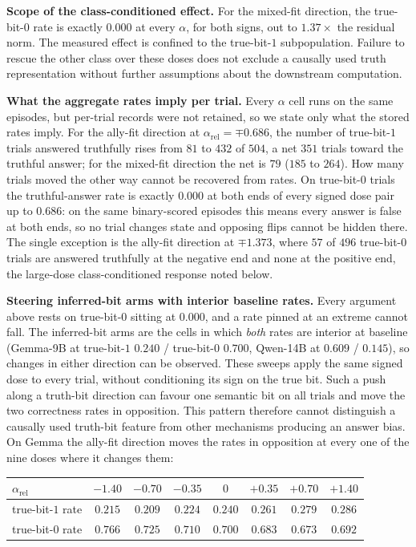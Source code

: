 \documentclass{article}
\begin{document}
\textbf{Scope of the class-conditioned effect.} For the mixed-fit direction, the true-bit-$0$ rate is exactly $0.000$ at every $\alpha$, for both signs, out to $1.37\times$ the residual norm. The measured effect is confined to the true-bit-$1$ subpopulation. Failure to rescue the other class over these doses does not exclude a causally used truth representation without further assumptions about the downstream computation.

\textbf{What the aggregate rates imply per trial.} Every $\alpha$ cell runs on the same episodes, but per-trial records were not retained, so we state only what the stored rates imply. For the ally-fit direction at $\alpha_{\mathrm{rel}} = \mp0.686$, the number of true-bit-$1$ trials answered truthfully rises from $81$ to $432$ of $504$, a net $351$ trials toward the truthful answer; for the mixed-fit direction the net is $79$ ($185$ to $264$). How many trials moved the other way cannot be recovered from rates. On true-bit-$0$ trials the truthful-answer rate is exactly $0.000$ at both ends of every signed dose pair up to $0.686$: on the same binary-scored episodes this means every answer is false at both ends, so no trial changes state and opposing flips cannot be hidden there. The single exception is the ally-fit direction at $\mp1.373$, where $57$ of $496$ true-bit-$0$ trials are answered truthfully at the negative end and none at the positive end, the large-dose class-conditioned response noted below.

\textbf{Steering inferred-bit arms with interior baseline rates.} Every argument above rests on true-bit-$0$ sitting at $0.000$, and a rate pinned at an extreme
cannot fall. The inferred-bit arms are the cells in which \emph{both} rates are interior at baseline (Gemma-9B at true-bit-$1$ $0.240$ / true-bit-$0$ $\mathbf{0.700}$, Qwen-14B at $0.609$ / $\mathbf{0.145}$), so changes in either direction can be observed. These sweeps apply the same signed dose to every trial, without conditioning its sign on the true bit. Such a push along a truth-bit direction can favour one semantic bit on all trials and move the two correctness rates in opposition. This pattern therefore cannot distinguish a causally used truth-bit feature from other mechanisms producing an answer bias. On Gemma the ally-fit direction moves the rates in opposition at every one of the nine doses where it changes them:

\begin{center}
\footnotesize
\setlength{\tabcolsep}{4pt}
\begin{tabular}{lccccccc}
\toprule
$\alpha_{\mathrm{rel}}$ & $-1.40$ & $-0.70$ & $-0.35$ & $0$ & $+0.35$ & $+0.70$ & $+1.40$ \\
\midrule
true-bit-$1$ rate & $0.215$ & $0.209$ & $0.224$ & $0.240$ & $0.261$ & $0.279$ & $0.286$ \\
true-bit-$0$ rate & $\mathbf{0.766}$ & $0.725$ & $0.710$ & $0.700$ & $0.683$ & $0.673$ & $0.692$ \\
\bottomrule
\end{tabular}
\end{center}
\end{document}
